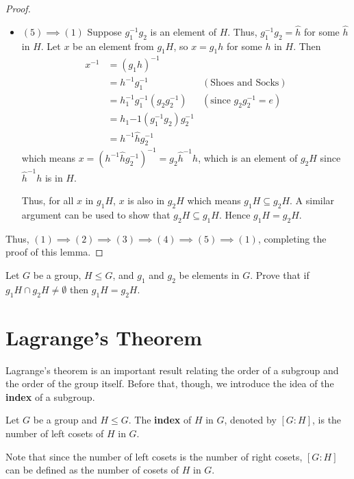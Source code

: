 \begin{proof}
\begin{itemize}
        \newpage

        \item $\boxed{(5) \implies (1)}$
        Suppose $g_1^{-1}g_2$ is an element of $H$. Thus, $g_1^{-1}g_2 = \hat{h}$ for some $\hat{h}$ in $H$. Let $x$ be an element from $g_1H$, so $x = g_1h$ for some $h$ in $H$. Then
        \begin{align*}
            x^{-1} &= (g_1h)^{-1}\\
            &= h^{-1}g_1^{-1} & (\text{Shoes and Socks})\\
            &= h_1^{-1}g_1^{-1}(g_2g_2^{-1}) & (\text{since }g_2g_2^{-1} = e)\\
            &= h_1{-1}(g_1^{-1}g_2)g_2^{-1}\\
            &= h^{-1}\hat{h}g_2^{-1}
        \end{align*}
        which means $x = \left(h^{-1}\hat{h}g_2^{-1}\right)^{-1} = g_2\hat{h}^{-1}h$, which is an element of $g_2H$ since $\hat{h}^{-1}h$ is in $H$.

        Thus, for all $x$ in $g_1H$, $x$ is also in $g_2H$ which means $g_1H \subseteq g_2H$. A similar argument can be used to show that $g_2H \subseteq g_1H$. Hence $g_1H = g_2H$.
    \end{itemize}

    Thus, $(1) \implies (2) \implies (3) \implies (4) \implies (5) \implies (1)$, completing the proof of this lemma.
\end{proof}

\begin{exercise}\label{exercise-intersection-of-cosets}
    Let $G$ be a group, $H \leq G$, and $g_1$ and $g_2$ be elements in $G$. Prove that if $g_1H \cap g_2H \neq \emptyset$ then $g_1H = g_2H$.
\end{exercise}

\newpage

\section{Lagrange's Theorem}
Lagrange's theorem is an important result relating the order of a subgroup and the order of the group itself. Before that, though, we introduce the idea of the \textbf{index} of a subgroup.
\begin{definition}
    Let $G$ be a group and $H \leq G$. The \textbf{index} of $H$ in $G$, denoted by $[G : H]$, is the number of left cosets of $H$ in $G$.
\end{definition}
Note that since the number of left cosets is the number of right cosets, $[G : H]$ can be defined as the number of cosets of $H$ in $G$.

